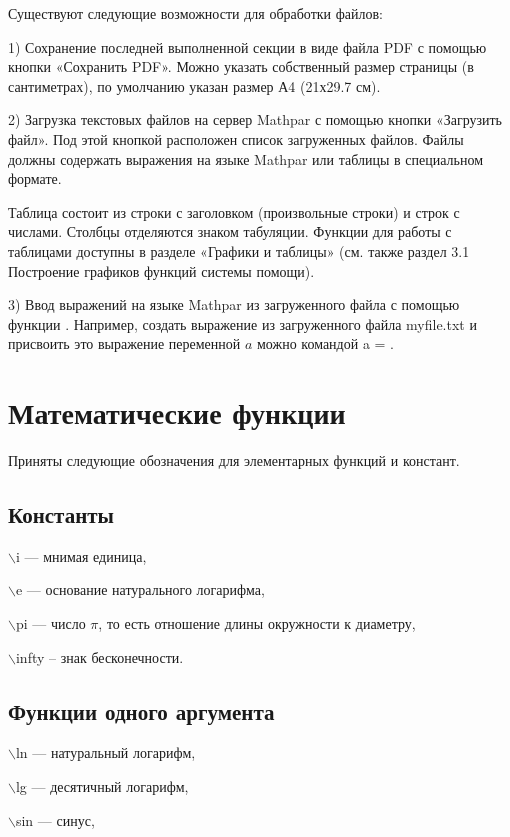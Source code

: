 Существуют следующие возможности для обработки файлов:

1) Сохранение последней выполненной секции в виде файла PDF с помощью
кнопки «Сохранить PDF». Можно указать собственный размер страницы (в сантиметрах),
по умолчанию указан размер А4 (21х29.7 см).

2) Загрузка текстовых файлов на сервер Mathpar с помощью кнопки «Загрузить файл».
Под этой кнопкой расположен список загруженных файлов. Файлы должны содержать выражения 
на языке Mathpar или таблицы в специальном формате.

Таблица состоит из строки с заголовком (произвольные строки) и строк с числами.
Столбцы отделяются знаком табуляции. Функции для работы с таблицами доступны 
в разделе «Графики и таблицы» (см. также раздел 3.1 Построение графиков функций 
системы помощи).

3) Ввод выражений на языке Mathpar из загруженного файла с помощью функции .
Например, создать выражение из загруженного файла myfile.txt и присвоить 
это выражение переменной $a$ можно командой a = .


\section{Математические функции}
Приняты следующие обозначения для элементарных функций и констант.

\subsection{Константы}
\hspace*{4mm}  $\backslash$i --- мнимая единица,

$\backslash$e --- основание натурального логарифма,

$\backslash$pi --- число $\pi$,  то есть отношение длины окружности к диаметру,

$\backslash$infty -- знак бесконечности.


\subsection{Функции одного аргумента}

\hspace*{4mm} $\backslash$ln --- натуральный логарифм, 

 $\backslash$lg --- десятичный логарифм, 

 $\backslash$sin --- синус, 

